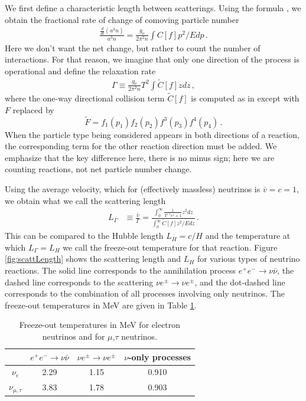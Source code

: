 We first define a characteristic length between scatterings. Using the formula , we obtain the fractional rate of change of comoving particle number
\begin{align}
\frac{\frac{d}{dt}(a^3 n)}{a^3n}=\frac{g_\nu}{2\pi^2n}\int C[f]p^2/Edp\,.
\end{align}
Here we don't want the net change, but rather to count the number of interactions. For that reason, we imagine that only one direction of the process is operational and define the relaxation rate
\begin{align}
\Gamma\equiv\frac{g_\nu}{2\pi^2n}T^2\int \tilde C[f]zdz\,,
\end{align}
where the one-way directional collision term $\tilde C[f]$ is computed as in  except with $F$ replaced by 
\begin{equation}
\tilde F=f_1(p_1)f_2(p_2)f^3(p_3)f^4(p_4)\,.
\end{equation}
When the particle type being considered appears in both directions of a reaction, the corresponding term for the other reaction direction must be added. We emphasize that the key difference here, there is no minus sign; here we are counting reactions, not net particle number change.

Using the average velocity, which for (effectively massless) neutrinos is $\bar v=c=1$, we obtain what we call the scattering length
\begin{align}
L_\Gamma&\equiv\displaystyle\frac{\bar v}{\Gamma}=\displaystyle\frac{\int_0^\infty\displaystyle\frac{1}{\Upsilon^{-1}e^z+1}z^2dz}{\int_0^\infty \tilde C[f] z^2/E dz}\,.
\end{align}
This can be compared to the Hubble length $L_H=c/H$ and the temperature at which $L_\Gamma=L_H$ we call the freeze-out temperature for that reaction. Figure \ref{fig:scattLength} shows the scattering length and $L_H$ for various types of neutrino reactions. The solid line corresponds to the annihilation process $e^+e^-\rightarrow \nu\bar\nu$, the dashed line corresponds to the scattering $\nu e^\pm\rightarrow \nu e^\pm$, and the dot-dashed line corresponds to the combination of all processes involving only neutrinos. The freeze-out temperatures in MeV are given in Table \ref{table:freezeoutTemp}.

\begin{table}[ht]
\centering 
\begin{tabular}{|c|c|c|c|}
\hline
 & $e^+e^-\rightarrow \nu\bar\nu$ & $\nu e^\pm\rightarrow \nu e^\pm$ & $\nu$-only processes\\
\hline
$\nu_e$ &2.29 & 1.15&0.910\\
\hline
$\nu_{\mu,\tau}$ &3.83 & 1.78& 0.903\\
\hline
\end{tabular}
\caption{Freeze-out temperatures in MeV for electron neutrinos and for $\mu$,$\tau$ neutrinos.}
\label{table:freezeoutTemp}
\end{table}

